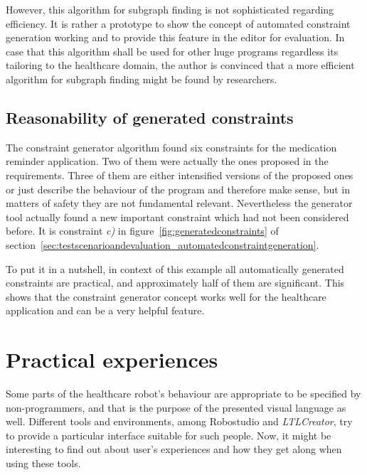 However, this algorithm for subgraph finding is not sophisticated regarding efficiency. It is rather a prototype to show the concept of automated constraint generation working and to provide this feature in the editor for evaluation. In case that this algorithm shall be used for other huge programs regardless its tailoring to the healthcare domain, the author is convinced that a more efficient algorithm for subgraph finding might be found by researchers.






\subsection{Reasonability of generated constraints}

The constraint generator algorithm found six constraints for the medication reminder application. Two of them were actually the ones proposed in the requirements. Three of them are either intensified versions of the proposed ones or just describe the behaviour of the program and therefore make sense, but in matters of safety they are not fundamental relevant.
Nevertheless the generator tool actually found a new important constraint which had not been considered before. It is constraint \emph{c)} in figure~\ref{fig:generatedconstraints} of section~\ref{sec:testscenarioandevaluation_automatedconstraintgeneration}.

To put it in a nutshell, in context of this example all automatically generated constraints are practical, and approximately half of them are significant. This shows that the constraint generator concept works well for the healthcare application and can be a very helpful feature.




\section{Practical experiences}
\label{sec:practicalexperiences}

Some parts of the healthcare robot's behaviour are appropriate to be specified by non-programmers, and that is the purpose of the presented visual language as well. Different tools and environments, among Robostudio and \emph{LTLCreator}, try to provide a particular interface suitable for such people. Now, it might be interesting to find out about user's experiences and how they get along when using these tools.

